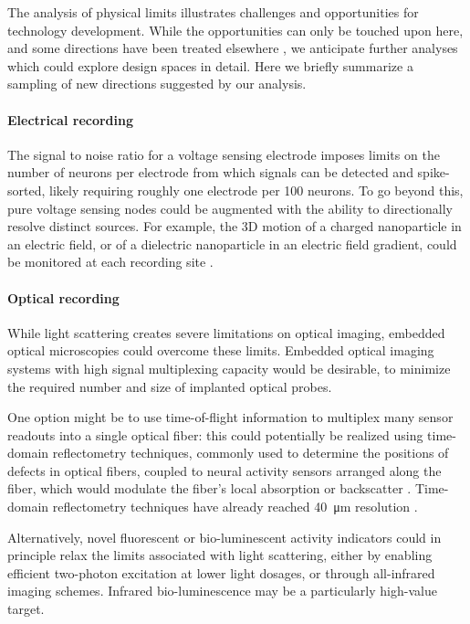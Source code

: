 The analysis of physical limits illustrates challenges and opportunities for technology development. While the opportunities can only be touched upon here, and some directions have been treated elsewhere \cite{Dean2013, alivisatos13, alivisatos2012brain}, we anticipate further analyses which could explore design spaces in detail. Here we briefly summarize a sampling of new directions suggested by our analysis.

\paragraph{Electrical recording} The signal to noise ratio for a voltage sensing electrode imposes limits on the number of neurons per electrode from which signals can be detected and spike-sorted, likely requiring roughly one electrode per \num{100} neurons. To go beyond this, pure voltage sensing nodes could be augmented with the ability to directionally resolve distinct sources. For example, the 3D motion of a charged nanoparticle in an electric field, or of a dielectric nanoparticle in an electric field gradient, could be monitored at each recording site \cite{WoodPersonalCommunication}.

\paragraph{Optical recording} While light scattering creates severe limitations on optical imaging, embedded optical microscopies could overcome these limits. Embedded optical imaging systems with high signal multiplexing capacity would be desirable, to minimize the required number and size of implanted optical probes. 

One option might be to use time-of-flight information to multiplex many sensor readouts into a single optical fiber: this could potentially be realized using time-domain reflectometry techniques, commonly used to determine the positions of defects in optical fibers, coupled to neural activity sensors arranged along the fiber, which would modulate the fiber's local absorption or backscatter \cite{WoodPersonalCommunication}. Time-domain reflectometry techniques have already reached \SI{40}{\micro\meter} resolution \cite{Lamy1981fi}.

Alternatively, novel fluorescent or bio-luminescent activity indicators could in principle relax the limits associated with light scattering, either by enabling efficient two-photon excitation at lower light dosages, or through all-infrared imaging schemes. Infrared bio-luminescence may be a particularly high-value target.

